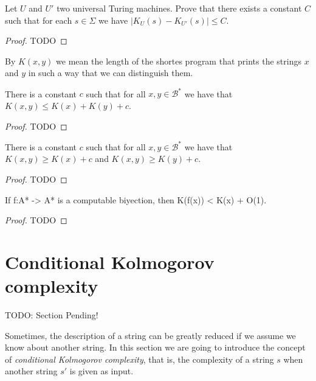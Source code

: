 \begin{proposition}
Let $U$ and $U'$ two universal Turing machines. Prove that there exists a constant $C$ such that for each $s \in \Sigma$ we have $\mid K_{U}(s) - K_{U'}(s) \mid \leq C$.
\end{proposition}
\begin{proof}
{\color{red} TODO}
\end{proof}

By $K(x, y)$ we mean the length of the shortes program that prints the strings $x$ and $y$ in such a way that we can distinguish them.

\begin{proposition}
\label{prop:additive_kolmogorov}
There is a constant $c$ such that for all $x, y \in\mathcal{B}^{\ast}$ we have that $K(x, y) \leq K(x) + K(y) + c$.
\end{proposition}
\begin{proof}
{\color{red} TODO}
\end{proof}

\begin{proposition}
\label{prop:excess_kolmogorov}
There is a constant $c$ such that for all $x, y \in\mathcal{B}^{\ast}$ we have that $K(x, y) \geq K(x) + c$ and $K(x, y) \geq K(y) + c$.
\end{proposition}
\begin{proof}
{\color{red} TODO}
\end{proof}


\begin{proposition}
If f:A* -> A* is a computable biyection, then K(f(x)) < K(x) + O(1).
\end{proposition}
\begin{proof}
{\color{red} TODO}
\end{proof}

%
%

\section{Conditional Kolmogorov complexity}

{\color{red} TODO: Section Pending!}

Sometimes, the description of a string can be greatly reduced if we assume we know about another string. In this section we are going to introduce the concept of \emph{conditional Kolmogorov complexity}, that is, the complexity of a string $s$ when another string $s'$ is given as input.

